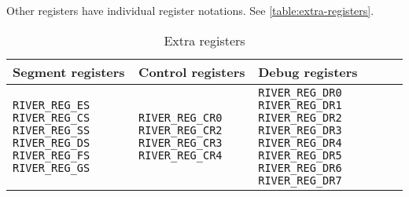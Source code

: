 \documentclass[12pt]{report}
\begin{document}
Other registers have individual register notations. See \autoref{table:extra-registers}.\\
\begin{table}[H]
	\begin{tabular}{| p{5cm} | p{5cm} | p{5cm} |}
		\hline
		\textbf{Segment registers} & \textbf{Control registers} & \textbf{Debug registers} \\ \hline
		\texttt{RIVER_REG_ES} \texttt{RIVER_REG_CS} \texttt{RIVER_REG_SS} \texttt{RIVER_REG_DS} \texttt{RIVER_REG_FS} \texttt{RIVER_REG_GS} &
		\texttt{RIVER_REG_CR0} \texttt{RIVER_REG_CR2} \texttt{RIVER_REG_CR3} \texttt{RIVER_REG_CR4} &
		\texttt{RIVER_REG_DR0} \texttt{RIVER_REG_DR1} \texttt{RIVER_REG_DR2} \texttt{RIVER_REG_DR3} \texttt{RIVER_REG_DR4} \texttt{RIVER_REG_DR5} \texttt{RIVER_REG_DR6} \texttt{RIVER_REG_DR7}\\ \hline
	\end{tabular}
	\caption{Extra registers}
	\label{table:extra-registers}
\end{table}
\end{document}
